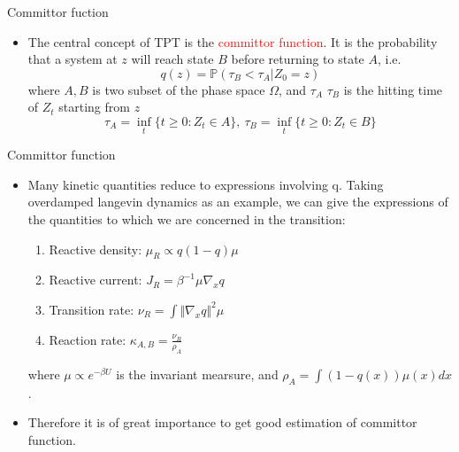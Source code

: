 \documentclass{beamer}
\newcommand{\rred}{\textcolor{red}}
\begin{document}
\begin{frame}{Committor fuction}
    \begin{itemize}
        \item The central concept of TPT is the \rred{committor function}. 
        It is the probability that a system at $z$ will reach state $B$ before returning to state $A$, i.e.
        \begin{equation*}
            q(z) = \mathbb{P}(\tau_{B}<\tau_{A}|Z_0 = z)
        \end{equation*}
        where $A,B$ is two subset of the phase space $\Omega$, and $\tau_A$ $\tau_B$ is the hitting time of $Z_t$ starting from $z$
        \begin{equation*}
            \tau_A = \inf_t\{t\geq0: Z_t \in A\}, \ \tau_B = \inf_t\{t\geq0: Z_t \in B\}
        \end{equation*}
    \end{itemize}
    
\end{frame}




\begin{frame}{Committor function}
    \begin{itemize}
        \item Many kinetic quantities reduce to expressions involving q. Taking overdamped langevin dynamics as an example,
        we can give the expressions of the quantities to which we are concerned in the transition:
        \begin{enumerate}
            \item Reactive density: $\mu_{R} \propto q (1-q)\mu$
            \item Reactive current: $J_R =\beta^{-1} \mu \nabla_x q$ 
            \item Transition rate: $\nu_R = \int \Vert \nabla_x q \Vert^2 \mu$
            \item Reaction rate: $\kappa_{A,B} = \frac{\nu_R}{\rho_A}$
        \end{enumerate}
        where $\mu \propto e^{-\beta U}$ is the invariant mearsure, and $\rho_A = \int (1-q(x))\mu(x)dx$.
        \item Therefore it is of great importance to get good estimation of committor function.
    \end{itemize}
\end{frame}

\end{document}
